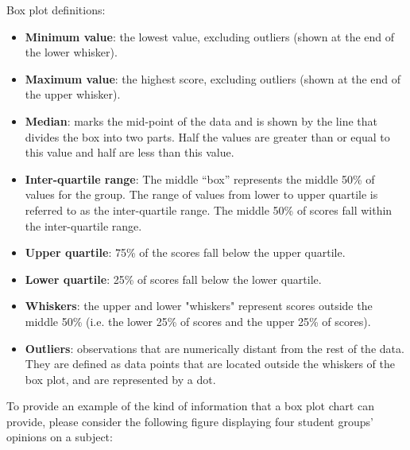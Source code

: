 Box plot definitions:
\begin{itemize}
    \item \textbf{Minimum value}: the lowest value, excluding outliers (shown at the end of the lower whisker).
    \item \textbf{Maximum value}: the highest score, excluding outliers (shown at the end of the upper whisker).
    \item \textbf{Median}: marks the mid-point of the data and is shown by the line that divides the box into two parts. Half the values are greater than or equal to this value and half are less than this value.
    \item \textbf{Inter-quartile range}: The middle “box” represents the middle 50\% of values for the group. The range of values from lower to upper quartile is referred to as the inter-quartile range. The middle 50\% of scores fall within the inter-quartile range.
    \item \textbf{Upper quartile}: 75\% of the scores fall below the upper quartile.
    \item \textbf{Lower quartile}: 25\% of scores fall below the lower quartile.
    \item \textbf{Whiskers}: the upper and lower "whiskers" represent scores outside the middle 50\% (i.e. the lower 25\% of scores and the upper 25\% of scores).
    \item \textbf{Outliers}: observations that are numerically distant from the rest of the data. They are defined as data points that are located outside the whiskers of the box plot, and are represented by a dot.
\end{itemize}

\noindent To provide an example of the kind of information that a box plot chart can provide, please consider the following figure displaying four student groups' opinions on a subject:



